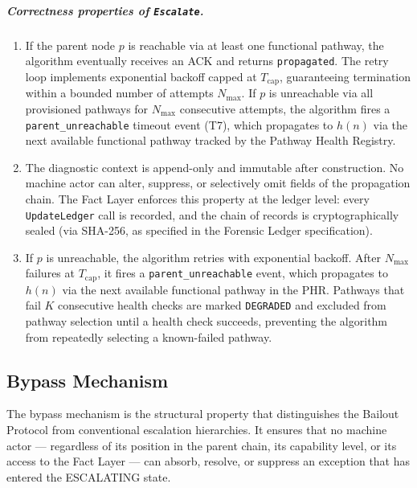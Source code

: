 \subparagraph{Correctness properties of \texttt{Escalate}.}

\begin{enumerate}
\item[\emph{Progress.}] If the parent node $p$ is reachable via at least one functional pathway, the algorithm eventually receives an ACK and returns \texttt{propagated}. The retry loop implements exponential backoff capped at $T_{\text{cap}}$, guaranteeing termination within a bounded number of attempts $N_{\max}$. If $p$ is unreachable via all provisioned pathways for $N_{\max}$ consecutive attempts, the algorithm fires a \texttt{parent\_unreachable} timeout event (T7), which propagates to $h(n)$ via the next available functional pathway tracked by the Pathway Health Registry.

\item[\emph{Integrity.}] The diagnostic context is append-only and immutable after construction. No machine actor can alter, suppress, or selectively omit fields of the propagation chain. The Fact Layer enforces this property at the ledger level: every \texttt{UpdateLedger} call is recorded, and the chain of records is cryptographically sealed (via SHA-256, as specified in the \bxthree{} Forensic Ledger specification).

\item[\emph{Liveness under pathway degradation.}] If $p$ is unreachable, the algorithm retries with exponential backoff. After $N_{\max}$ failures at $T_{\text{cap}}$, it fires a \texttt{parent\_unreachable} event, which propagates to $h(n)$ via the next available functional pathway in the PHR. Pathways that fail $K$ consecutive health checks are marked \texttt{DEGRADED} and excluded from pathway selection until a health check succeeds, preventing the algorithm from repeatedly selecting a known-failed pathway.
\end{enumerate}

\subsection{Bypass Mechanism}\label{sec:bypass-mechanism}

The bypass mechanism is the structural property that distinguishes the Bailout Protocol from conventional escalation hierarchies. It ensures that no machine actor — regardless of its position in the parent chain, its capability level, or its access to the Fact Layer — can absorb, resolve, or suppress an exception that has entered the ESCALATING state.

